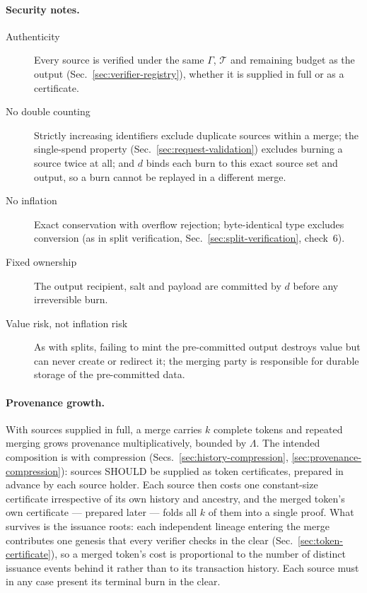 \paragraph{Security notes.}
\begin{description}
	\item[Authenticity] Every source is verified under the same $\Gamma$, $\mathcal{T}$ and remaining budget as the output (Sec.~\ref{sec:verifier-registry}), whether it is supplied in full or as a certificate.
	\item[No double counting] Strictly increasing identifiers exclude duplicate sources within a merge; the single-spend property (Sec.~\ref{sec:request-validation}) excludes burning a source twice at all; and $d$ binds each burn to this exact source set and output, so a burn cannot be replayed in a different merge.
	\item[No inflation] Exact conservation with overflow rejection; byte-identical type excludes conversion (as in split verification, Sec.~\ref{sec:split-verification}, check~6).
	\item[Fixed ownership] The output recipient, salt and payload are committed by $d$ before any irreversible burn.
	\item[Value risk, not inflation risk] As with splits, failing to mint the pre-committed output destroys value but can never create or redirect it; the merging party is responsible for durable storage of the pre-committed data.
\end{description}

\paragraph{Provenance growth.} With sources supplied in full, a merge carries $k$ complete tokens and repeated merging grows provenance multiplicatively, bounded by $\Lambda$. The intended composition is with compression (Secs.~\ref{sec:history-compression}, \ref{sec:provenance-compression}): sources SHOULD be supplied as token certificates, prepared in advance by each source holder. Each source then costs one constant-size certificate irrespective of its own history and ancestry, and the merged token's own certificate --- prepared later --- folds all $k$ of them into a single proof. What survives is the issuance roots: each independent lineage entering the merge contributes one genesis that every verifier checks in the clear (Sec.~\ref{sec:token-certificate}), so a merged token's cost is proportional to the number of distinct issuance events behind it rather than to its transaction history. Each source must in any case present its terminal burn in the clear.

